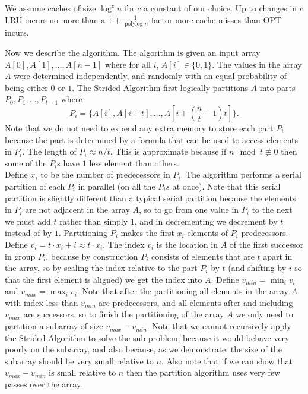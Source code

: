 \documentclass[twocolumn, twoside, 11pt]{article}
\renewcommand{\paragraph}[1]{\vspace{0.09in}\noindent{\bf \boldmath #1.}}
\begin{document}
We assume caches of size $\log^c n$ for $c$ a constant of our choice. 
Up to changes in $c$ LRU incurs no more than a $1+\frac{1}{\operatorname{polylog}{n}}$ factor more cache misses than OPT incurs.

\paragraph{Strided Algorithm Description}
Now we describe the algorithm.
The algorithm is given an input array $A[0],A[1],\ldots,A[n-1]$ where for all $i$, $A[i] \in \{0, 1\}$.
The values in the array $A$ were determined independently, and randomly with an equal probability of being either $0$ or $1$.
The Strided Algorithm first logically partitions $A$ into parts $P_0, P_1, \ldots, P_{t-1}$ where 
\begin{equation*}
	P_i = \{A[i], A[i+t], \ldots, A[i+(\frac{n}{t}-1)t]\}.
\end{equation*}
Note that we do not need to expend any extra memory to store each part $P_i$ because the part is determined by a formula that can be used to access elements in $P_i$.
The length of $P_i \approx n/t$. This is approximate because if $n \mod t \not\equiv 0$ then some of the $P_i$s have $1$ less element than others.\\
Define $x_i$ to be the number of predecessors in $P_i$.
The algorithm performs a serial partition of each $P_i$ in parallel (on all the $P_is$ at once).
Note that this serial partition is slightly different than a typical serial partition because the elements in $P_i$ are not adjacent in the array $A$, so to go from one value in $P_i$ to the next we must add $t$ rather than simply $1$, and in decrementing we decrement by $t$ instead of by $1$.
Partitioning $P_i$ makes the first $x_i$ elements of $P_i$ predecessors.
Define $v_i = t\cdot x_i+i \approx t\cdot x_i$.
The index $v_i$ is the location in $A$ of the first successor in group $P_i$, because by construction $P_i$ consists of elements that are $t$ apart in the array, so by scaling the index relative to the part $P_i$ by $t$ (and shifting by $i$ so that the first element is aligned) we get the index into $A$.
Define $v_{min} = \min_i{v_i}$ and $v_{max} = \max_i {v_i}$.
Note that after the partitioning all elements in the array $A$ with index less than $v_{min}$ are predecessors, and all elements after and including $v_{max}$ are successors, so to finish the partitioning of the array $A$ we only need to partition a subarray of size $v_{max}-v_{min}$.
Note that we cannot recursively apply the Strided Algorithm to solve the sub problem, because it would behave very poorly on the subarray, and also because, as we demonstrate, the size of the subarray should be very small relative to $n$.
Also note that if we can show that $v_{max} - v_{min}$ is small relative to $n$ then the partition algorithm uses very few passes over the array.
\end{document}
